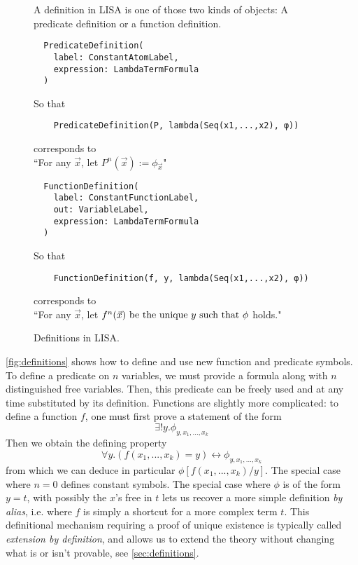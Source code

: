 \begin{figure}
  A definition in LISA is one of those two kinds of objects: A predicate definition or a function definition.
  \begin{lstlisting}
  PredicateDefinition(
    label: ConstantAtomLabel,
    expression: LambdaTermFormula
  )
\end{lstlisting}
  So that
  \begin{lstlisting}
    PredicateDefinition(P, lambda(Seq(x1,...,x2), φ)) 
  \end{lstlisting}
  corresponds to \\
  \hspace*{1.3em}``For any $\vec{x}$, let $P^n(\vec{x}) := \phi_{\vec{x}}$"

  \vspace*{2em}
  \begin{lstlisting}
  FunctionDefinition(
    label: ConstantFunctionLabel,
    out: VariableLabel, 
    expression: LambdaTermFormula
  )
\end{lstlisting}
  So that
  \begin{lstlisting}
    FunctionDefinition(f, y, lambda(Seq(x1,...,x2), φ)) 
  \end{lstlisting}
  corresponds to \\
  \hspace*{1.3em}``For any $\vec{x}$, let $f^n(\vec{x}) \textnormal{ be the unique } y \textnormal{ such that } \phi$ holds."

  \caption{Definitions in LISA.}
  \label{fig:definitions}
\end{figure}

\autoref{fig:definitions} shows how to define and use new function and predicate symbols. To define a predicate on $n$ variables, we must provide a formula along with $n$ distinguished free variables. Then, this predicate can be freely used and at any time substituted by its definition. Functions are slightly more complicated: to define a function $f$, one must first prove a statement of the form
$$\exists ! y. \phi_{y, x_1,...,x_k}$$
Then we obtain the defining property
$$\forall y. (f(x_1,...,x_k)=y) \leftrightarrow \phi_{y, x_1,...,x_k}$$
from which we can deduce in particular $\phi[f(x_1,...,x_k)/y]$.
The special case where $n=0$ defines constant symbols. The special case where $\phi$ is of the form $y=t$, with possibly the $x$'s free in $t$ lets us recover a more simple definition \textit{by alias}, i.e. where  $f$ is simply a shortcut for a more complex term $t$.
This definitional mechanism requiring a proof of unique existence is typically called \textit{extension by definition}, and allows us to extend the theory without changing what is or isn't provable, see \autoref{sec:definitions}.

